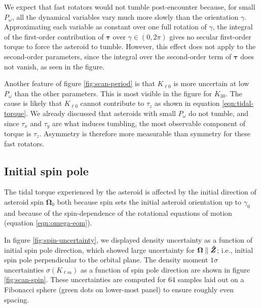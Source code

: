 We expect that fast rotators would not tumble post-encounter because, for small $P_\omega$, all the dynamical variables vary much more slowly than the orientation $\gamma$. Approximating each variable as constant over one full rotation of $\gamma$, the integral of the first-order contribution of $\bm \tau$ over $\gamma \in (0, 2\pi)$ gives no secular first-order torque to force the asteroid to tumble. However, this effect does not apply to the second-order parameters, since the integral over the second-order term of $\bm \tau$ does not vanish, as seen in the figure.

Another feature of figure \ref{fig:scan-period} is that $K_{\ell 0}$ is more uncertain at low $P_\omega$ than the other parameters. This is most visible in the figure for $K_{30}$. The cause is likely that $K_{\ell 0}$ cannot contribute to $\tau_z$ as shown in equation \ref{eqn:tidal-torque}. We already discussed that asteroids with small $P_\omega$ do not tumble, and since $\tau_x$ and $\tau_y$ are what induces tumbling, the most observable component of torque is $\tau_z$. Asymmetry is therefore more measurable than symmetry for these fast rotators.


\subsection{Initial spin pole}
\label{sec:scan-spin}

The tidal torque experienced by the asteroid is affected by the initial direction of asteroid spin $\bm \Omega_0$ both because spin sets the initial asteroid orientation up to $\gamma_0$ and because of the spin-dependence of the rotational equations of motion (equation \ref{eqn:omega-eom}).

In figure \ref{fig:spin-uncertainty}, we displayed density uncertainty as a function of initial spin pole direction, which showed large uncertainty for $\bm \Omega \parallel \bm{\hat{Z}}$; i.e., initial spin pole perpendicular to the orbital plane. The density moment $1\sigma$ uncertainties $\sigma(K_{\ell m})$ as a function of spin pole direction are shown in figure \ref{fig:scan-spin}. These uncertainties are computed for 64 samples laid out on a Fibonacci sphere (green dots on lower-most panel) to ensure roughly even spacing.

